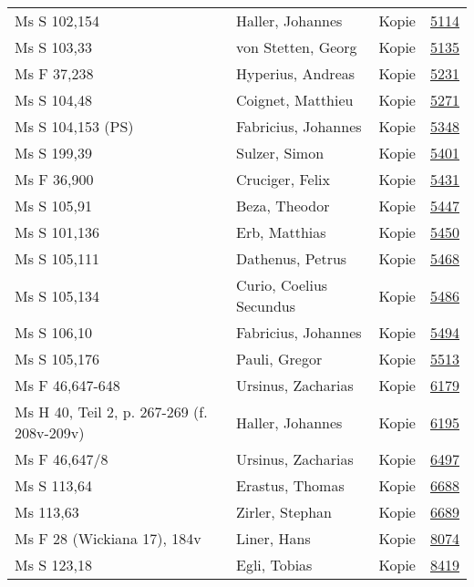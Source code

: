 \documentclass[10pt,a4paper,landscape]{report}
\begin{document}
\begin{longtable}{p{16cm}p{4cm}lr}
Ms S 102,154	&	Haller, Johannes	&	Kopie	&	\href{http://130.60.24.72/assignment/5114}{5114}\\
Ms S 103,33	&	von Stetten, Georg	&	Kopie	&	\href{http://130.60.24.72/assignment/5135}{5135}\\
Ms F 37,238	&	Hyperius, Andreas	&	Kopie	&	\href{http://130.60.24.72/assignment/5231}{5231}\\
Ms S 104,48	&	Coignet, Matthieu	&	Kopie	&	\href{http://130.60.24.72/assignment/5271}{5271}\\
Ms S 104,153 (PS)	&	Fabricius, Johannes	&	Kopie	&	\href{http://130.60.24.72/assignment/5348}{5348}\\
Ms S 199,39	&	Sulzer, Simon	&	Kopie	&	\href{http://130.60.24.72/assignment/5401}{5401}\\
Ms F 36,900	&	Cruciger, Felix	&	Kopie	&	\href{http://130.60.24.72/assignment/5431}{5431}\\
Ms S 105,91	&	Beza, Theodor	&	Kopie	&	\href{http://130.60.24.72/assignment/5447}{5447}\\
Ms S 101,136	&	Erb, Matthias	&	Kopie	&	\href{http://130.60.24.72/assignment/5450}{5450}\\
Ms S 105,111	&	Dathenus, Petrus	&	Kopie	&	\href{http://130.60.24.72/assignment/5468}{5468}\\
Ms S 105,134	&	Curio, Coelius Secundus	&	Kopie	&	\href{http://130.60.24.72/assignment/5486}{5486}\\
Ms S 106,10	&	Fabricius, Johannes	&	Kopie	&	\href{http://130.60.24.72/assignment/5494}{5494}\\
Ms S 105,176	&	Pauli, Gregor	&	Kopie	&	\href{http://130.60.24.72/assignment/5513}{5513}\\
Ms F 46,647-648	&	Ursinus, Zacharias	&	Kopie	&	\href{http://130.60.24.72/assignment/6179}{6179}\\
Ms H 40, Teil 2, p. 267-269 (f. 208v-209v)	&	Haller, Johannes	&	Kopie	&	\href{http://130.60.24.72/assignment/6195}{6195}\\
Ms F 46,647/8	&	Ursinus, Zacharias	&	Kopie	&	\href{http://130.60.24.72/assignment/6497}{6497}\\
Ms S 113,64	&	Erastus, Thomas	&	Kopie	&	\href{http://130.60.24.72/assignment/6688}{6688}\\
Ms 113,63	&	Zirler, Stephan	&	Kopie	&	\href{http://130.60.24.72/assignment/6689}{6689}\\
Ms F 28 (Wickiana 17), 184v	&	Liner, Hans	&	Kopie	&	\href{http://130.60.24.72/assignment/8074}{8074}\\
Ms S 123,18	&	Egli, Tobias	&	Kopie	&	\href{http://130.60.24.72/assignment/8419}{8419}\\

\end{longtable}
\end{document}
